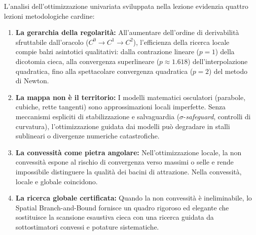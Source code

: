 L'analisi dell'ottimizzazione univariata sviluppata nella lezione evidenzia quattro lezioni metodologiche cardine:
\begin{enumerate}
    \item \textbf{La gerarchia della regolarit\`a:} All'aumentare dell'ordine di derivabilit\`a sfruttabile dall'oracolo ($C^0 \to C^1 \to C^2$), l'efficienza della ricerca locale compie balzi asintotici qualitativi: dalla contrazione lineare ($p = 1$) della dicotomia cieca, alla convergenza superlineare ($p \approx 1.618$) dell'interpolazione quadratica, fino alla spettacolare convergenza quadratica ($p = 2$) del metodo di Newton.
    \item \textbf{La mappa non \`e il territorio:} I modelli matematici osculatori (parabole, cubiche, rette tangenti) sono approssimazioni locali imperfette. Senza meccanismi espliciti di stabilizzazione e salvaguardia ($\sigma$-\textit{safeguard}, controlli di curvatura), l'ottimizzazione guidata dai modelli pu\`o degradare in stalli sublineari o divergenze numeriche catastrofiche.
    \item \textbf{La convessit\`a come pietra angolare:} Nell'ottimizzazione locale, la non convessit\`a espone al rischio di convergenza verso massimi o selle e rende impossibile distinguere la qualit\`a dei bacini di attrazione. Nella convessit\`a, locale e globale coincidono.
    \item \textbf{La ricerca globale certificata:} Quando la non convessit\`a \`e ineliminabile, lo Spatial Branch-and-Bound fornisce un quadro rigoroso ed elegante che sostituisce la scansione esaustiva cieca con una ricerca guidata da sottostimatori convessi e potature sistematiche.
\end{enumerate}
